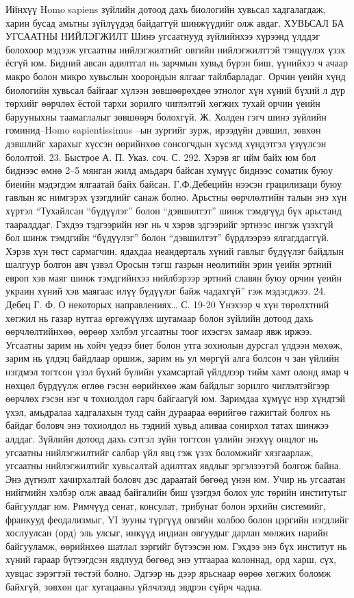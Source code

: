 Ийнхүү Homo sapiens зүйлийн дотоод дахь биологийн хувьсал хадгалагдаж, харин бусад амьтны зүйлүүдэд байдаггүй шинжүүдийг олж авдаг.
ХУВЬСАЛ БА УГСААТНЫ НИЙЛЭГЖИЛТ
Шинэ угсаатнууд зүйлийнхээ хүрээнд үлддэг болохоор мэдээж угсаатны нийлэгжилтийг овгийн нийлэгжилттэй тэнцүүлэх үзэх ёсгүй юм. Бидний авсан адилтгал нь зарчмын хувьд бүрэн биш, үүнийхээ ч ачаар макро болон микро хувьслын хоорондын ялгааг тайлбарладаг. Орчин үеийн хүнд биологийн хувьсал байгааг хүлээн зөвшөөрөхдөө этнолог хүн хүний бүхий л дүр төрхийг өөрчлөх ёстой тархи зорилго чиглэлтэй хөгжих тухай орчин үеийн барууныхны таамаглалыг зөвшөөрч болохгүй.
Ж. Холден гэгч шинэ зүйлийн гоминид–Homo sapientissimus –ын зургийг зурж, ирээдүйн дэвшил, зөвхөн дэвшлийг харахыг хүссэн өөрийнхөө сонсогчдын хүсэлд хүндэтгэл үзүүлсэн бололтой. 23. Быстрое А. П. Указ. соч. С. 292.
Хэрэв яг ийм байх юм бол биднээс өмнө 2–5 мянган жилд амьдарч байсан хүмүүс биднээс соматик буюу биеийн мэдэгдэм ялгаатай байх байсан. Г.Ф.Дебецийн нээсэн грацилизаци буюу гавлын яс нимгэрэх үзэгдлийг санаж болно. Арьстны өөрчлөлтийн талын энэ хүн хүртэл “Тухайлсан “бүдүүлэг” болон “дэвшилтэт” шинж тэмдгүүд бүх арьстанд тааралддаг. Гэхдээ тэдгээрийн нэг нь ч хэрэв эдгээрийг эртнээс ингэж үзэхгүй бол шинж тэмдгийн “бүдүүлэг” болон “дэвшилтэт” бүрдлээрээ ялгагддаггүй. Хэрэв хүн төст сармагчин, ядахдаа неандерталь хүний гавлыг бүдүүлэг байдлын шалгуур болгон авч үзвэл Оросын тэгш газрын неолитийн эрин үеийн эртний европ хэв маяг шинж тэмдгийнхээ нийлбэрээр эртний славян буюу орчин үеийн украин хүний хэв маягаас илүү бүдүүлэг байж чадахгүй” гэж мэдэгджээ. 24. Дебец Г. Ф. О некоторых направлениях… С. 19-20
Үнэхээр ч хүн төрөлхтний хөгжил нь газар нутгаа өргөжүүлэх шугамаар болон зүйлийн дотоод дахь өөрчлөлтийнхөө, өөрөөр хэлбэл угсаатны тоог ихэсгэх замаар явж иржээ. Угсаатны зарим нь хойч үедээ биет болон утга зохиолын дурсгал үлдээн мөхөж, зарим нь үлдэц байдлаар оршиж, зарим нь ул мөргүй алга болсон ч зан үйлийн нэгдмэл тогтсон үзэл бүхий бүлийн ухамсартай үйлдлээр тийм хамт олонд ямар ч нөхцөл бүрдүүлж өглөө гэсэн өөрийнхөө жам байдлыг зорилго чиглэлтэйгээр өөрчлөх гэсэн нэг ч тохиолдол гарч байгаагүй юм.
Заримдаа хүмүүс нэр хүндтэй үхэл, амьдралаа хадгалахын тулд сайн дураараа өөрийгөө гажигтай болгох нь байдаг боловч энэ тохиолдол нь тэдний хувьд аливаа сонирхол татах шинжээ алддаг. Зүйлийн дотоод дахь сэтгэл зүйн тогтсон үзлийн энэхүү онцлог нь угсаатны нийлэгжилтийг салбар үйл явц гэж үзэх боломжийг хязгаарлаж, угсаатны нийлэгжилтийг хувьсалтай адилтгах явдлыг эргэлзээтэй болгож байна.
Энэ дүгнэлт хачирхалтай боловч дэс дараатай бөгөөд үнэн юм. Учир нь угсаатан нийгмийн хэлбэр олж аваад байгалийн биш үзэгдэл болох улс төрийн институтыг байгуулдаг юм. Римчүүд сенат, консулат, трибунат болон эрхийн системийг, франкууд феодализмыг, YI зууны түргүүд овгийн холбоо болон цэргийн нэгдлийг хослуулсан (орд) эль улсыг, инкүүд индиан овгуудыг дарлан мөлжих нарийн байгууламж, өөрийнхөө шатлал зэргийг бүтээсэн юм. Гэхдээ энэ бүх институт нь хүний гараар бүтээгдсэн явдлууд бөгөөд энэ утгаараа колоннад, орд харш, сүх, хувцас зэрэгтэй төстэй болно. Эдгээр нь дээр ярьснаар өөрөө хөгжих боломж байхгүй, зөвхөн цаг хугацааны үйлчлэлд эвдрэн сүйрч чадна.
